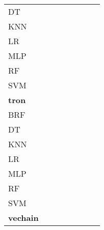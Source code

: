 \documentclass{article}
\begin{document}
{\begin{tabular}{|l|c|c|c|c|c|c|c|}
DT & \cellcolor{white}  & \cellcolor{gray}  & \cellcolor{white}  & \cellcolor{black}  & \cellcolor{black}  & \cellcolor{white}  & \cellcolor{black}  \\ 
KNN & \cellcolor{white}  & \cellcolor{white}  & \cellcolor{gray}  & \cellcolor{black}  & \cellcolor{black}  & \cellcolor{white}  & \cellcolor{black}  \\ 
LR & \cellcolor{white}  & \cellcolor{white}  & \cellcolor{white}  & \cellcolor{gray}  & \cellcolor{black}  & \cellcolor{white}  & \cellcolor{black}  \\ 
MLP & \cellcolor{white}  & \cellcolor{white}  & \cellcolor{white}  & \cellcolor{white}  & \cellcolor{gray}  & \cellcolor{white}  & \cellcolor{white}  \\ 
RF & \cellcolor{white}  & \cellcolor{black}  & \cellcolor{black}  & \cellcolor{black}  & \cellcolor{black}  & \cellcolor{gray}  & \cellcolor{black}  \\ 
SVM & \cellcolor{white}  & \cellcolor{white}  & \cellcolor{white}  & \cellcolor{white}  & \cellcolor{black}  & \cellcolor{white}  & \cellcolor{gray}  \\ 
\hline
\textbf{tron} \\ \hline
BRF & \cellcolor{gray}  & \cellcolor{white}  & \cellcolor{black}  & \cellcolor{black}  & \cellcolor{black}  & \cellcolor{white}  & \cellcolor{black}  \\ 
DT & \cellcolor{white}  & \cellcolor{gray}  & \cellcolor{white}  & \cellcolor{black}  & \cellcolor{black}  & \cellcolor{white}  & \cellcolor{white}  \\ 
KNN & \cellcolor{white}  & \cellcolor{white}  & \cellcolor{gray}  & \cellcolor{black}  & \cellcolor{black}  & \cellcolor{white}  & \cellcolor{white}  \\ 
LR & \cellcolor{white}  & \cellcolor{white}  & \cellcolor{white}  & \cellcolor{gray}  & \cellcolor{black}  & \cellcolor{white}  & \cellcolor{white}  \\ 
MLP & \cellcolor{white}  & \cellcolor{white}  & \cellcolor{white}  & \cellcolor{white}  & \cellcolor{gray}  & \cellcolor{white}  & \cellcolor{white}  \\ 
RF & \cellcolor{white}  & \cellcolor{white}  & \cellcolor{white}  & \cellcolor{black}  & \cellcolor{black}  & \cellcolor{gray}  & \cellcolor{black}  \\ 
SVM & \cellcolor{white}  & \cellcolor{white}  & \cellcolor{white}  & \cellcolor{white}  & \cellcolor{black}  & \cellcolor{white}  & \cellcolor{gray}  \\ 
\hline
\textbf{vechain} \\ \hline

\end{tabular}}
\end{document}

